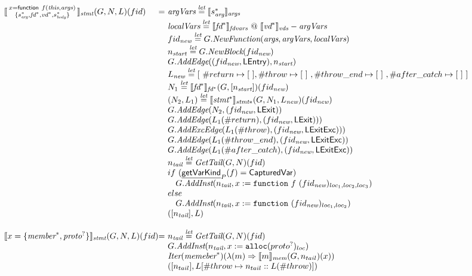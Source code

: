 \[\begin{array}{l@{}l@{~}l}
\transfun{\irfunexprsmall{x}{f}{\emph{this}}{\emph{args}}{s_{\emph{arg}}^*}{\emph{fd}^*}{\emph{vd}^*}{s_{\emph{body}}^*}}_{\emph{stmt}}(G,N,L)(fid) & = &
	\argVars \letval \transfun{s_{\emph{arg}}^*}_{\emph{args}} \\
	& & \localVars \letval \transfun{\emph{fd}^*}_{\emph{fdvars}} ~@~ \transfun{\emph{vd}^*}_{\emph{vds}} - \argVars \\
	& & fid_{\emph{new}} \letval G.\emph{NewFunction}(\emph{args}, \argVars, \localVars)\\
	& & n_{\emph{start}} \letval G.\emph{NewBlock}(fid_{\emph{new}})\\
	& & G.\emph{AddEdge}((fid_{\emph{new}},\LEntry), n_{\emph{start}})\\
	& & L_{\emph{new}} \letval [\ \#return \mapsto [\ ], \#throw \mapsto [\ ]\ , \#throw\_end \mapsto [\ ]\ , \#after\_catch \mapsto [\ ]\ ] \\
	& & N_1 \letval \transfun{\emph{fd}^*}_{\emph{fd}^*}(G,[n_{\emph{start}}])(fid_{\emph{new}})\\
	& & (N_2,L_1) \letval \transfun{\emph{stmt}^*}_{\emph{stmt}*}(G,N_1,L_{\emph{new}})(fid_{\emph{new}})\\
	& & G.\emph{AddEdge}(N_2,(fid_{\emph{new}},\LExit))\\
	& & G.\emph{AddEdge}(L_1(\#return),(fid_{\emph{new}},\LExit)))\\
	& & G.\emph{AddExcEdge}(L_1(\#throw),(fid_{\emph{new}},\LExitExc)))\\
	& & G.\emph{AddEdge}(L_1(\#throw\_end),(fid_{\emph{new}},\LExitExc))\\
	& & G.\emph{AddEdge}(L_1(\#after\_catch),(fid_{\emph{new}},\LExitExc))\\
	& & n_{\emph{tail}} \letval \GetTail(G,N)(fid)\\
	& & if\ (\chf{getVarKind}_P(f) = \SF{CapturedVar}) \\
	& & \phantom{if} G.\emph{AddInst}(n_{\emph{tail}},x := \TT{function}\ f\ (fid_{\emph{new}})_{loc_1,loc_2,loc_3})\\
   & & else\ \\
	& & \phantom{if} G.\emph{AddInst}(n_{\emph{tail}},x := \TT{function}\ (fid_{\emph{new}})_{loc_1,loc_2})\\
	& & ([n_{\emph{tail}}],L)\\
	& & \\

\transfun{\irobject{x}{\emph{member}^*,\emph{proto}^{?}}}_{\emph{stmt}}(G,N,L)(fid) & = &
	n_{\emph{tail}} \letval \GetTail(G,N)(fid)\\
	& & G.\emph{AddInst}(n_{\emph{tail}},x := \TT{alloc}(proto^{?})_{loc})\\
	& & \Iter(\emph{memeber}^*)(\lambda(m)\Rightarrow \transfun{m}_{\emph{mem}}(G,n_{tail})(x))\\
	& & ([n_{tail}],L[\#throw \mapsto n_{tail}::L(\#throw)])\\
	& & \\


\end{array}\]
